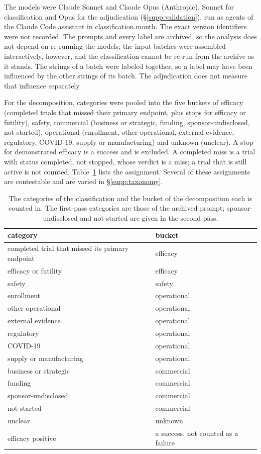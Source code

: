 \documentclass[11pt]{article}
\begin{document}
The models were Claude Sonnet and Claude Opus (Anthropic), Sonnet for classification and Opus for the adjudication (\S\ref{supp:validation}), run as agents of the Claude Code assistant in \num{classification.month}. The exact version identifiers were not recorded. The prompts and every label are archived, so the analysis does not depend on re-running the models; the input batches were assembled interactively, however, and the classification cannot be re-run from the archive as it stands. The strings of a batch were labeled together, so a label may have been influenced by the other strings of its batch. The adjudication does not measure that influence separately.

For the decomposition, categories were pooled into the five buckets of efficacy (completed trials that missed their primary endpoint, plus stops for efficacy or futility), safety, commercial (business or strategic, funding, sponsor-undisclosed, not-started), operational (enrollment, other operational, external evidence, regulatory, \mbox{COVID-19}, supply or manufacturing) and unknown (unclear). A stop for demonstrated efficacy is a success and is excluded. A completed miss is a trial with status completed, not stopped, whose verdict is a miss; a trial that is still active is not counted. Table~\ref{tab:buckets} lists the assignment. Several of these assignments are contestable and are varied in \S\ref{supp:taxonomy}.

\begin{table}[H]
\centering
\caption{The categories of the classification and the bucket of the decomposition each is counted in. The first-pass categories are those of the archived prompt; sponsor-undisclosed and not-started are given in the second pass.}
\label{tab:buckets}
\small
\begin{tabular}{ll}
\toprule
category & bucket \\
\midrule
completed trial that missed its primary endpoint & efficacy \\
efficacy or futility & efficacy \\
safety & safety \\
enrollment & operational \\
other operational & operational \\
external evidence & operational \\
regulatory & operational \\
\mbox{COVID-19} & operational \\
supply or manufacturing & operational \\
business or strategic & commercial \\
funding & commercial \\
sponsor-undisclosed & commercial \\
not-started & commercial \\
unclear & unknown \\
efficacy positive & a success, not counted as a failure \\
\bottomrule
\end{tabular}
\end{table}
\end{document}
